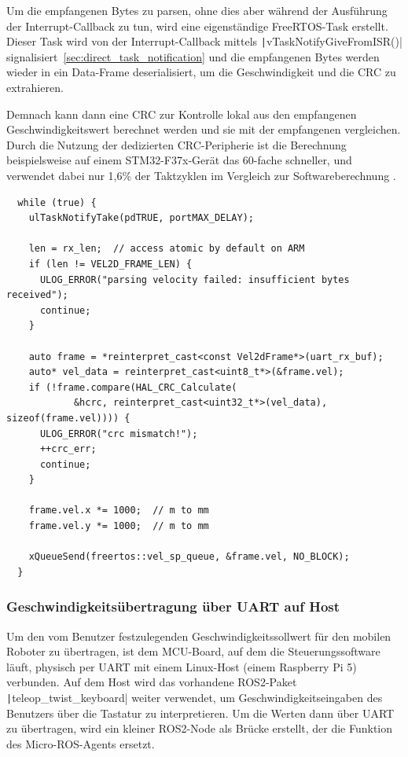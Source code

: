 Um die empfangenen Bytes zu parsen, ohne dies aber während der Ausführung der
Interrupt-Callback zu tun, wird eine eigenständige FreeRTOS-Task erstellt.
Dieser Task wird von der Interrupt-Callback mittels
\texttt|vTaskNotifyGiveFromISR()|
signalisiert~\ref{sec:direct_task_notification} und die empfangenen Bytes werden
wieder in ein Data-Frame deserialisiert, um die Geschwindigkeit und die CRC zu
extrahieren.

Demnach kann dann eine CRC zur Kontrolle lokal aus den empfangenen
Geschwindigkeitswert berechnet werden und sie mit der empfangenen vergleichen.
Durch die Nutzung der dedizierten CRC-Peripherie ist die Berechnung
beispielsweise auf einem STM32-F37x-Gerät das 60-fache schneller, und verwendet
dabei nur 1,6\% der Taktzyklen im Vergleich zur Softwareberechnung \cite[S.
9]{AN4187}.

\begin{code}
\begin{verbatim}
  while (true) {
    ulTaskNotifyTake(pdTRUE, portMAX_DELAY);

    len = rx_len;  // access atomic by default on ARM
    if (len != VEL2D_FRAME_LEN) {
      ULOG_ERROR("parsing velocity failed: insufficient bytes received");
      continue;
    }

    auto frame = *reinterpret_cast<const Vel2dFrame*>(uart_rx_buf);
    auto* vel_data = reinterpret_cast<uint8_t*>(&frame.vel);
    if (!frame.compare(HAL_CRC_Calculate(
            &hcrc, reinterpret_cast<uint32_t*>(vel_data), sizeof(frame.vel)))) {
      ULOG_ERROR("crc mismatch!");
      ++crc_err;
      continue;
    }

    frame.vel.x *= 1000;  // m to mm
    frame.vel.y *= 1000;  // m to mm

    xQueueSend(freertos::vel_sp_queue, &frame.vel, NO_BLOCK);
  }
\end{verbatim}
\end{code}

\subsubsection{Geschwindigkeitsübertragung über UART auf Host}

Um den vom Benutzer festzulegenden Geschwindigkeitssollwert für den mobilen
Roboter zu übertragen, ist dem MCU-Board, auf dem die Steuerungssoftware läuft,
physisch per UART mit einem Linux-Host (einem Raspberry Pi 5) verbunden. Auf dem
Host wird das vorhandene ROS2-Paket \texttt|teleop_twist_keyboard|
weiter verwendet, um Geschwindigkeitseingaben des Benutzers über die Tastatur zu
interpretieren. Um die Werten dann über UART zu übertragen, wird ein kleiner
ROS2-Node als Brücke erstellt, der die Funktion des Micro-ROS-Agents ersetzt.

